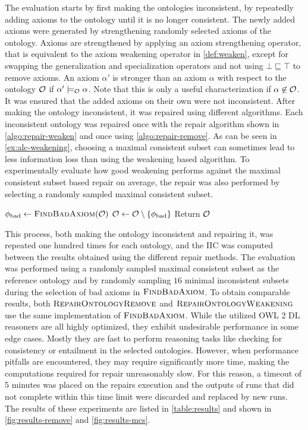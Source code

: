 The evaluation starts by first making the ontologies inconsistent, by repeatedly adding axioms to the ontology until it is no longer consistent. The newly added axioms were generated by strengthening randomly selected axioms of the ontology. Axioms are strengthened by applying an axiom strengthening operator, that is equivalent to the axiom weakening operator in \cref{def:weaken}, except for swapping the generalization and specialization operators and not using $\bot \sqsubseteq \top$ to remove axioms. An axiom $\alpha'$ is stronger than an axiom $\alpha$ with respect to the ontology $\mathcal{O}$ if $\alpha' \models_\mathcal{O} \alpha$. Note that this is only a useful characterization if $\alpha \not\in \mathcal{O}$. It was ensured that the added axioms on their own were not inconsistent. After making the ontology inconsistent, it was repaired using different algorithms. Each inconsistent ontology was repaired once with the repair algorithm shown in \cref{algo:repair-weaken} and once using \cref{algo:repair-remove}. As can be seen in \cref{ex:alc-weakening}, choosing a maximal consistent subset can sometimes lead to less information loss than using the weakening based algorithm. To experimentally evaluate how good weakening performs against the maximal consistent subset based repair on average, the repair was also performed by selecting a randomly sampled maximal consistent subset.

\begin{algorithm}[ht]
  \begin{algorithmic}
      \State $\phi_\textnormal{bad} \gets \textsc{FindBadAxiom}(\mathcal{O})$
      \State $\mathcal{O} \gets \mathcal{O} \setminus \{\phi_\textnormal{bad}\}$
    \EndWhile
    \State Return $\mathcal{O}$
  \end{algorithmic}
  \caption{$\textsc{RepairOntologyRemove}(\Omc)$}
  \label{algo:repair-remove}
\end{algorithm}

This process, both making the ontology inconsistent and repairing it, was repeated one hundred times for each ontology, and the IIC was computed between the results obtained using the different repair methods. The evaluation was performed using a randomly sampled maximal consistent subset as the reference ontology and by randomly sampling $16$ minimal inconsistent subsets during the selection of bad axioms in $\textsc{FindBadAxiom}$. To obtain comparable results, both $\textsc{RepairOntologyRemove}$ and $\textsc{RepairOntologyWeakening}$ use the same implementation of $\textsc{FindBadAxiom}$. While the utilized OWL 2 DL reasoners are all highly optimized, they exhibit undesirable performance in some edge cases. Mostly they are fast to perform reasoning tasks like checking for consistency or entailment in the selected ontologies. However, when performance pitfalls are encountered, they may require significantly more time, making the computations required for repair unreasonably slow. For this reason, a timeout of 5 minutes was placed on the repairs execution and the outputs of runs that did not complete within this time limit were discarded and replaced by new runs. The results of these experiments are listed in \cref{table:results} and shown in \cref{fig:results-remove} and \cref{fig:results-mcs}.

